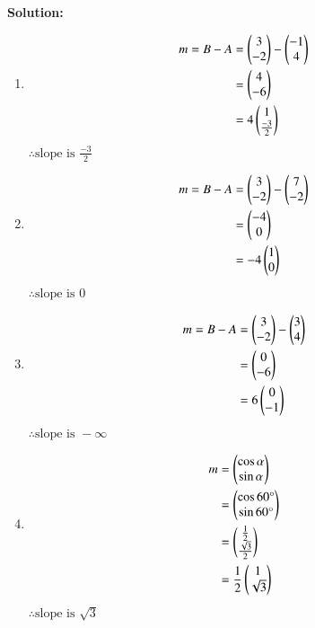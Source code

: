 \documentclass[journal]{IEEEtran}
\begin{document}
\textbf{Solution: }\\
\begin{enumerate}
	\item{
			\begin{align} m = B-A &= \begin{pmatrix}3 \\ -2\end{pmatrix} - \begin{pmatrix}-1 \\ 4\end{pmatrix} \\
				&= \begin{pmatrix}4 \\ -6\end{pmatrix} \\
				&= 4\begin{pmatrix}1 \\ \frac{-3}{2}\end{pmatrix}
		\end{align}
		$\therefore \text{slope is } \frac{-3}{2}$
	}
	\item{
			\begin{align} m = B-A &= \begin{pmatrix}3 \\ -2\end{pmatrix} - \begin{pmatrix}7 \\ -2\end{pmatrix} \\
				&= \begin{pmatrix}-4 \\ 0\end{pmatrix} \\
				&= -4\begin{pmatrix}1 \\ 0\end{pmatrix}
		\end{align}
		$\therefore \text{slope is } 0$
	}
	\item{
			\begin{align} m = B-A &= \begin{pmatrix}3 \\ -2\end{pmatrix} - \begin{pmatrix}3 \\ 4\end{pmatrix} \\
				&= \begin{pmatrix}0 \\ -6\end{pmatrix} \\
				&= 6\begin{pmatrix}0 \\ -1\end{pmatrix}
		\end{align}
		$\therefore \text{slope is } -\infty$
	}
	\item{
			\begin{align} m &= \begin{pmatrix}\cos \alpha \\ \sin \alpha\end{pmatrix} \\
				&= \begin{pmatrix}\cos 60\degree \\ \sin 60\degree\end{pmatrix} \\
				&= \begin{pmatrix}\frac{1}{2} \\ \frac{\sqrt{3}}{2}\end{pmatrix} \\
				&= \frac{1}{2} \begin{pmatrix}1 \\ \sqrt{3}\end{pmatrix}
		\end{align}
		$\therefore \text{slope is } \sqrt{3}$
	}
\end{enumerate}
\end{document}
